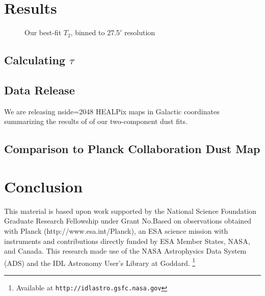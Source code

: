 \documentclass{emulateapj}
\begin{document}
\section{Results}

\begin{figure*}
\begin{center}
\caption{Our best-fit $T_2$, binned to 27.5$'$ resolution}
\end{center}
\end{figure*}

\subsection{Calculating $\tau$}

\subsection{Data Release}
We are releasing nside=2048 HEALPix maps in Galactic coordinates summarizing 
the results of of our two-component dust fits.


\subsection{Comparison to Planck Collaboration Dust Map}

\section{Conclusion}

This material is based upon work supported by the National Science Foundation 
Graduate Research Fellowship under Grant No.Based on observations obtained with
 Planck (http://www.esa.int/Planck), an ESA science mission with instruments 
and contributions directly funded by ESA Member States, NASA, and Canada. This 
research made use of the NASA Astrophysics Data System (ADS) and the IDL 
Astronomy User's Library at Goddard. \footnote{Available at 
\texttt{http://idlastro.gsfc.nasa.gov}}



\end{document}
